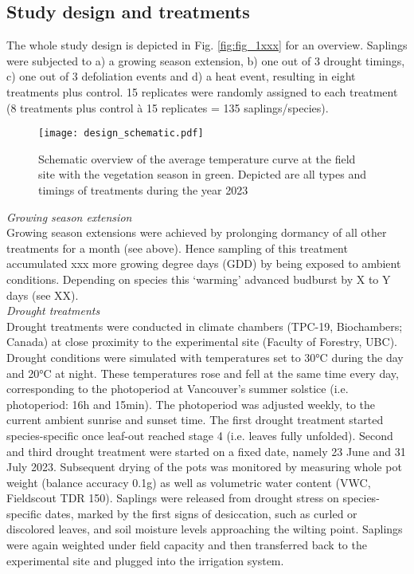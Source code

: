 \documentclass{article}
\begin{document}
		\subsection*{Study design and treatments}
	The whole study design is depicted in Fig. \ref{fig:fig_1xxx} for an overview. Saplings were subjected to a) a growing season extension, b) one out of 3 drought timings, c) one out of 3 defoliation events and d) a heat event, resulting in eight treatments plus control. 15 replicates were randomly assigned to each treatment (8 treatments plus control à 15 replicates = 135 saplings/species). \\  
	
			\begin{figure}[H]
		\centering
		\texttt{[image: design\_schematic.pdf]} 
		\caption{Schematic overview of the average temperature curve at the field site with the vegetation season in green. Depicted are all types and timings of treatments during the year 2023 }
		\label{fig:fig_1xx}
	\end{figure}
	
	\textit{Growing season extension} \\
	Growing season extensions were achieved by prolonging dormancy of all other treatments for a month (see above). Hence sampling of this treatment accumulated xxx more growing degree days (GDD) by being exposed to ambient conditions. Depending on species this `warming' advanced budburst by X to Y days (see XX).\\
	
	\textit{Drought treatments} \\
	Drought treatments were conducted in climate chambers (TPC-19, Biochambers; Canada) at close proximity to the experimental site (Faculty of Forestry, UBC). Drought conditions were simulated with temperatures set to 30°C during the day and 20°C at night. These temperatures rose and fell at the same time every day, corresponding to the photoperiod at Vancouver’s summer solstice (i.e. photoperiod: 16h and 15min). The photoperiod was adjusted weekly, to the current ambient sunrise and sunset time. 
	The first drought treatment started species-specific once leaf-out reached stage 4 (i.e. leaves fully unfolded). Second and third drought treatment were started on a fixed date, namely 23 June and 31 July 2023. Subsequent drying of the pots was monitored by measuring whole pot weight (balance accuracy 0.1g) as well as volumetric water content (VWC, Fieldscout TDR 150). Saplings were released from drought stress on species-specific dates, marked by the first signs of desiccation, such as curled or discolored leaves, and soil moisture levels approaching the wilting point. %
	Saplings were again weighted under field capacity and then transferred back to the experimental site and plugged into the irrigation system. \\
	
\end{document}
